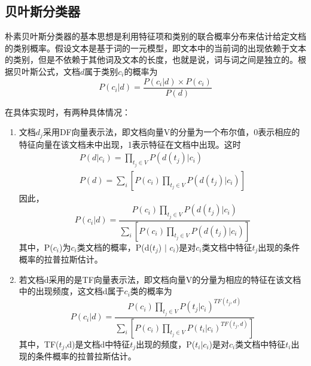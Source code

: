 \documentclass[UTF8]{ctexart}
\begin{document}
\subsection{贝叶斯分类器}	
	朴素贝叶斯分类器的基本思想是利用特征项和类别的联合概率分布来估计给定文档的类别概率。假设文本是基于词的一元模型，即文本中的当前词的出现依赖于文本的类别，但是不依赖于其他词及文本的长度，也就是说，词与词之间是独立的。根据贝叶斯公式，文档$d$属于类别$c_i$的概率为\begin{displaymath}P(c_i \vert d)=\frac{P(c_i \vert d)\times P(c_i)}{P(d)} \end{displaymath}
	\par 在具体实现时，有两种具体情况：
	\begin{enumerate}
		\item 文档$d_j$采用DF向量表示法，即文档向量V的分量为一个布尔值，0表示相应的特征向量在该文档未中出现，1表示特征在文档中出现。这时
		\begin{eqnarray}
			\nonumber P(d \vert c_i)=\prod_{t_j\in V} P(d(t_j) \vert c_i)  \\ 
			\nonumber P(d)=\sum_i[P(c_i)\prod_{t_j\in V} P(d(t_j) \vert c_i)]
		\end{eqnarray}
	因此，
		\begin{displaymath}
			P(c_i \vert d)=\frac{P(c_i)\prod_{t_j\in V} P(d(t_j) \vert c_i)}{\sum_i[P(c_i)\prod_{t_j\in V} P(d(t_j) \vert c_i)]}
		\end{displaymath}
	其中，P($c_i$)为$c_i$类文档的概率，P(d($t_j$) $\vert$ $c_i$)是对$c_i$类文档中特征$t_j$出现的条件概率的拉普拉斯估计。
		\item 若文档d采用的是TF向量表示法，即文档向量V的分量为相应的特征在该文档中的出现频度，这文档d属于$c_i$类的概率为
		\begin{displaymath}
			P(c_i \vert d)=\frac{P(c_i)\prod_{t_j\in V} P(t_j \vert c_i)^{TF(t_j, d)}}{\sum_i[P(c_i)\prod_{t_j\in V} P(t_i \vert c_i)^{TF(t_j, d)}]}	
		\end{displaymath}
	其中，TF($t_j$,d)是文档d中特征$t_j$出现的频度，P($t_i \vert c_i$)是对$c_i$类文档中特征$t_i$出现的条件概率的拉普拉斯估计。
	\end{enumerate}
\end{document}
